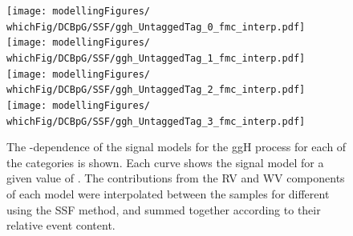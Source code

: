 \begin{figure}[htp!]
\centering
\texttt{[image: modellingFigures/\\whichFig/DCBpG/SSF/ggh\_UntaggedTag\_0\_fmc\_interp.pdf]} 
\texttt{[image: modellingFigures/\\whichFig/DCBpG/SSF/ggh\_UntaggedTag\_1\_fmc\_interp.pdf]} \\ 
\texttt{[image: modellingFigures/\\whichFig/DCBpG/SSF/ggh\_UntaggedTag\_2\_fmc\_interp.pdf]} 
\texttt{[image: modellingFigures/\\whichFig/DCBpG/SSF/ggh\_UntaggedTag\_3\_fmc\_interp.pdf]} \\
\caption{The \mH-dependence of the signal models for the ggH process for each of the \Untagged categories is shown. Each curve shows the signal model for a given value of \mH. The contributions from the RV and WV components of each model were interpolated between the samples for different \mH using the SSF method, and summed together according to their relative event content.}

\label{fig:model:sig_interpolation}
\end{figure}

